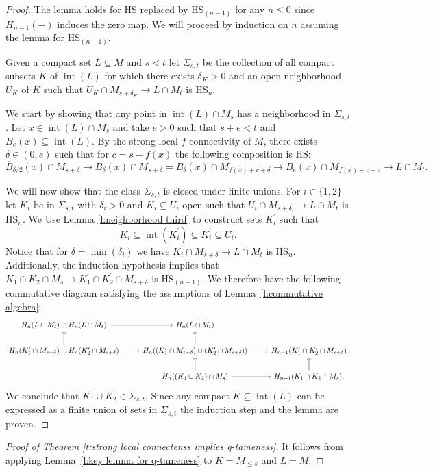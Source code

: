 \documentclass{amsart}
\theoremstyle{definition}
\newcommand{\HS}{\mathrm{HS}}
\DeclareMathOperator{\interior}{int}
\begin{document}
\begin{proof}
	The lemma holds for $\HS$ replaced by $\HS_{(n-1)}$ for any $n \leq 0$ since $H_{n-1}(-)$ induces the zero map. We will proceed by induction on $n$ assuming the lemma for $\HS_{(n-1)}$. 
	
	Given a compact set $L \subseteq M$ and $s < t$ let $\Sigma_{s, t}$ be the collection of all compact subsets $K$ of $\interior(L)$ for which there exists $\delta_K > 0$ and an open neighborhood $U_K$ of $K$ such that $U_K \cap M_{s+\delta_K} \to L \cap M_{t}$ is $\HS_n$.
	
	We start by showing that any point in $\interior(L) \cap M_s$ has a neighborhood in $\Sigma_{s, t}$.
	Let $x \in \interior(L) \cap M_{s}$ and take $e > 0$ such that $s + e < t$ and $B_e(x) \subseteq \interior(L)$.
	By the strong local-$f$-connectivity of $M$, there exists $\delta \in (0, e)$ such that for $c = s - f(x)$ the following composition is $\HS$:
	\begin{equation*}
	\overline B_{\delta/2}(x) \cap M_{s + \delta} \to
	B_\delta(x) \cap M_{s + \delta} =
	B_\delta(x) \cap M_{f(x) + c + \delta} \to
	B_e(x) \cap M_{f(x) + c + e} \to
	L \cap M_{t}.
	\end{equation*}  
	
	We will now show that the class $\Sigma_{s,t}$ is closed under finite unions.
	For $i \in \{1, 2\}$ let $K_i$ be in $\Sigma_{s,t}$ with $\delta_i > 0$ and $K_i \subseteq U_i$ open such that $U_{i} \cap M_{s+\delta_i} \to L \cap M_{t}$ is $\HS_n$.
	We Use Lemma \ref{l:neighborhood third} to construct sets $K_i^\prime$ such that
	\begin{equation*}
	K_i \subseteq \interior(K_i^\prime) \subseteq K_i^\prime \subseteq U_i.
	\end{equation*}
	Notice that for $\delta = \min(\delta_i)$ we have $K_i^\prime \cap M_{s+\delta} \to L \cap M_t$ is $\HS_n$.
	Additionally, the induction hypothesis implies that $K_1 \cap K_2 \cap M_s \to K_1^\prime \cap K_2^\prime \cap M_{s+\delta}$ is $\HS_{(n-1)}$.
	We therefore have the following commutative diagram satisfying the assumptions of Lemma~\ref{l:commutative algebra}:
	\begin{equation*}
	\begin{tikzcd}
	H_n(L \cap M_t) \oplus H_n(L \cap M_t) \arrow[r] &
	H_n(L \cap M_t) & \\
	H_{n}(K_1^\prime \cap M_{s+\delta}) \oplus H_n(K_2^\prime \cap M_{s+\delta}) \arrow[r] \arrow[u] & 
	H_{n}((K_1^\prime \cap M_{s+\delta}) \cup (K_2^\prime \cap M_{s+\delta})) \arrow[r] \arrow[u] &
	H_{n-1}(K_1^\prime \cap K_2^\prime \cap M_{s+\delta}) \\ & 
	H_{n}((K_1 \cup K_2) \cap M_s) \arrow[r] \arrow[u] &
	H_{n-1}(K_1 \cap K_2 \cap M_s). \arrow[u]
	\end{tikzcd}
	\end{equation*}
	We conclude that $K_1 \cup K_2 \in \Sigma_{s, t}$.
	Since any compact $K \subseteq \interior(L)$ can be expressed as a finite union of sets in $\Sigma_{s,t}$ the induction step and the lemma are proven.
\end{proof}

\begin{proof}[Proof of Theorem \ref{t:strong local connectenss implies q-tameness}]
	 It follows from applying Lemma~\ref{l:key lemma for q-tameness} to $K = M_{\leq s}$ and $L = M$.
\end{proof}
\end{document}
